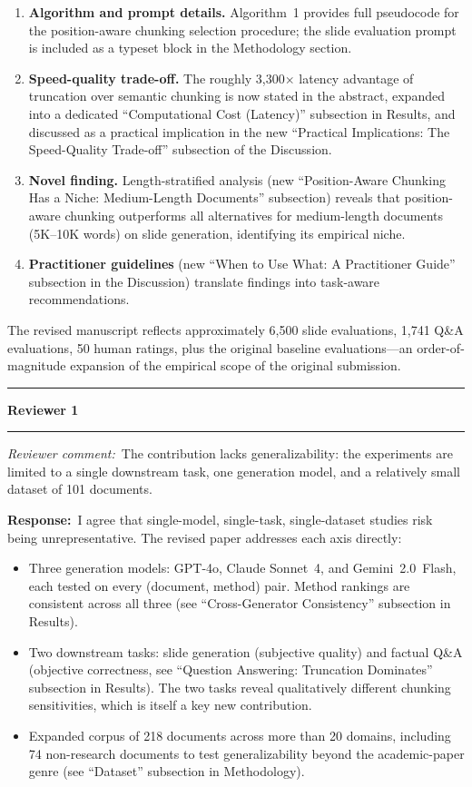 \documentclass[11pt]{article}
\newcommand{\reviewer}[1]{\noindent\textbf{\large Reviewer #1}\medskip\hrule\medskip}
\newcommand{\rcomment}[1]{\noindent\textcolor{revcomment}{\textit{Reviewer comment:}}~#1\par\medskip}
\newcommand{\rresponse}[1]{\noindent\textcolor{response}{\textbf{Response:}}~#1\par\medskip\medskip}
\begin{document}
\begin{enumerate}
    \item \textbf{Algorithm and prompt details.} Algorithm~1 provides full pseudocode for the position-aware chunking selection procedure; the slide evaluation prompt is included as a typeset block in the Methodology section.
    \item \textbf{Speed-quality trade-off.} The roughly 3{,}300$\times$ latency advantage of truncation over semantic chunking is now stated in the abstract, expanded into a dedicated ``Computational Cost (Latency)'' subsection in Results, and discussed as a practical implication in the new ``Practical Implications: The Speed-Quality Trade-off'' subsection of the Discussion.
    \item \textbf{Novel finding.} Length-stratified analysis (new ``Position-Aware Chunking Has a Niche: Medium-Length Documents'' subsection) reveals that position-aware chunking outperforms all alternatives for medium-length documents (5K--10K words) on slide generation, identifying its empirical niche.
    \item \textbf{Practitioner guidelines} (new ``When to Use What: A Practitioner Guide'' subsection in the Discussion) translate findings into task-aware recommendations.
\end{enumerate}

The revised manuscript reflects approximately 6{,}500 slide evaluations, 1{,}741 Q\&A evaluations, 50 human ratings, plus the original baseline evaluations---an order-of-magnitude expansion of the empirical scope of the original submission.

\bigskip
\hrule
\bigskip

\reviewer{1}

\rcomment{The contribution lacks generalizability: the experiments are limited to a single downstream task, one generation model, and a relatively small dataset of 101 documents.}

\rresponse{I agree that single-model, single-task, single-dataset studies risk being unrepresentative. The revised paper addresses each axis directly:
\begin{itemize}
    \item Three generation models: GPT-4o, Claude Sonnet~4, and Gemini~2.0~Flash, each tested on every (document, method) pair. Method rankings are consistent across all three (see ``Cross-Generator Consistency'' subsection in Results).
    \item Two downstream tasks: slide generation (subjective quality) and factual Q\&A (objective correctness, see ``Question Answering: Truncation Dominates'' subsection in Results). The two tasks reveal qualitatively different chunking sensitivities, which is itself a key new contribution.
    \item Expanded corpus of 218 documents across more than 20 domains, including 74 non-research documents to test generalizability beyond the academic-paper genre (see ``Dataset'' subsection in Methodology).
\end{itemize}}
\end{document}

